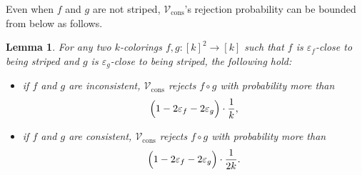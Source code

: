 \documentclass[11pt,fleqn]{article}
\renewcommand{\epsilon}{\varepsilon}
\newcommand{\V}{\calV}
\newcommand{\f}{f}
\newcommand{\g}{g}
\newcommand{\Vcons}{\V_\mathrm{cons}}
\newcommand{\calV}{\mathcal{V}}
\newtheorem{lemma}[theorem]{Lemma}
\theoremstyle{definition}
\numberwithin{equation}{section}
\begin{document}
Even when $\f$ and $\g$ are not striped,
$\Vcons$'s rejection probability can be bounded from below as follows.


\begin{lemma}
\label{lem:Cut-hard:cons:far}
    For any two $k$-colorings $\f,\g \colon [k]^2 \to [k]$ such that
    $\f$ is $\epsilon_{\f}$-close to being striped and 
    $\g$ is $\epsilon_{\g}$-close to being striped,
    the following hold\textup{:}
    \begin{itemize}
    \item if $\f$ and $\g$ are inconsistent,
        $\Vcons$ rejects $\f \circ \g$ with probability more than
        \begin{align}
            \Bigl( 1-2 \epsilon_{\f} - 2\epsilon_{\g} \Bigr) \cdot \frac{1}{k},
        \end{align}
    \item if $\f$ and $\g$ are consistent,
        $\Vcons$ rejects $\f \circ \g$ with probability more than
        \begin{align}
            \Bigl( 1-2 \epsilon_{\f} - 2\epsilon_{\g} \Bigr) \cdot \frac{1}{2k}.
        \end{align}
    \end{itemize}
\end{lemma}
\end{document}
